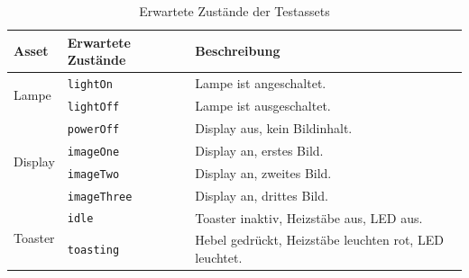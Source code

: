 \begin{table}[H]
  \centering
  \begin{tabularx}{\linewidth}{llX}
    \toprule
    Asset                    & Erwartete Zustände  & Beschreibung                                          \\
    \midrule
    \multirow{2}{*}{Lampe}   & \texttt{lightOn}    & Lampe ist angeschaltet.                               \\
                             & \texttt{lightOff}   & Lampe ist ausgeschaltet.                              \\
    \midrule
    \multirow{4}{*}{Display} & \texttt{powerOff}   & Display aus, kein Bildinhalt.                         \\
                             & \texttt{imageOne}   & Display an, erstes Bild.                              \\
                             & \texttt{imageTwo}   & Display an, zweites Bild.                             \\
                             & \texttt{imageThree} & Display an, drittes Bild.                             \\
    \midrule
    \multirow{2}{*}{Toaster} & \texttt{idle}       & Toaster inaktiv, Heizstäbe aus, LED aus.              \\
                             & \texttt{toasting}   & Hebel gedrückt, Heizstäbe leuchten rot, LED leuchtet. \\
    \bottomrule
  \end{tabularx}
  \caption{Erwartete Zustände der Testassets}\label{tab:testassets_zustände}
\end{table}

